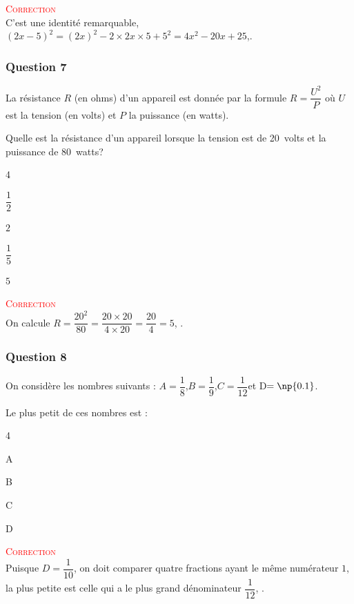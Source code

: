 \textcolor{red}{\textsc{Correction}}\\
C'est une identité remarquable, \mbox{$(2x-5)^2=(2x)^2-2\times2x\times5+5^2=4x^2-20x+25$},.
\subsubsection*{Question 7}

	La résistance $R$ (en ohms) d'un appareil est donnée par la formule \mbox{$R=\dfrac{U^2}{P}$} où $U$ est la tension (en volts) et $P$ la puissance (en watts).

	Quelle est la résistance d'un appareil lorsque la tension est de 20~volts et la puissance de 80~watts?

		\begin{enumerate}[label=\alph*)]
		\begin{multicols}{4}
		\null\vfill	\item $\dfrac12$ \vfill \null
			\columnbreak
		\null\vfill		\item $2$ \vfill \null
			\columnbreak
		\null\vfill		\item $\dfrac15$ \vfill \null
			\columnbreak
		\null\vfill		\item $5$\vfill\null

		\end{multicols}
	\end{enumerate}


	\textcolor{red}{\textsc{Correction}}\\
	On calcule \mbox{$R=\dfrac{20^2}{80}=\dfrac{20\times{20}}{4\times{20}}=\dfrac{20}{4}=5$}, \framebox[1.2\width]{réponse D}.
\subsubsection*{Question 8}
On considère les nombres suivants : \quad \mbox{$A=\dfrac18$},\quad \mbox{$B=\dfrac19$},\quad \mbox{$C=\dfrac{1}{12}$}\quad et \quad \mbox{D$=\np{0.1}$}.

Le plus petit de ces nombres est :
\begin{enumerate}[label=\alph*)]
	\begin{multicols}{4}
		\item A
		\item B
		\item C
		\item D
		\end{multicols}
\end{enumerate}


\textcolor{red}{\textsc{Correction}}\\
Puisque \mbox{$D=\dfrac{1}{10}$}, on doit comparer quatre fractions ayant le même numérateur $1$, la plus petite est celle qui a le plus grand dénominateur \mbox{$\dfrac{1}{12}$}, .
\vspace{10mm}
\begin{center}
\end{center}

\vspace{10mm}
